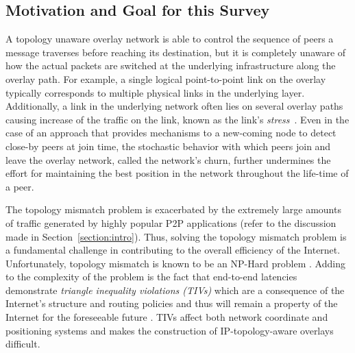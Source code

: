 \subsection{Motivation and Goal for this Survey}
A topology unaware overlay network is able to control the sequence of peers a
message traverses before reaching its destination, but it is completely unaware
of how the actual packets are switched at the underlying infrastructure along
the overlay path. For example, a single logical point-to-point link on the
overlay typically corresponds to multiple physical links in the
underlying layer. Additionally, a link in the underlying network often lies
on several overlay paths causing increase of the traffic on the
link, known as the link's \emph{stress}~\cite{CRSZ2002}. Even in the case
of an approach that provides mechanisms to a new-coming node to detect close-by
peers at join time, the stochastic behavior with which peers join and leave
the overlay network, called the network's churn, further undermines the effort
for maintaining the best position in the network throughout the life-time of a
peer.

The topology mismatch problem is exacerbated by the extremely large amounts of
traffic generated by highly popular P2P applications (refer to the discussion
made in Section~\ref{section:intro}). Thus, solving the topology mismatch
problem is a fundamental challenge in contributing to the overall efficiency of
the Internet. Unfortunately, topology mismatch is known to be an NP-Hard problem
\cite{NPBOOK,C2000}. Adding to the complexity of the problem
is the fact that end-to-end latencies demonstrate \emph{triangle inequality
violations (TIVs)} which are a consequence of the Internet's structure and
routing policies and thus will remain a property of the Internet for the
foreseeable future \cite{zheng_irprtt_2005}. TIVs affect both network coordinate
\cite{cox_vivaldi_2004,wong_meridian_2005} and positioning \cite{ng_gnp_2001}
systems and makes the construction of IP-topology-aware overlays difficult.

